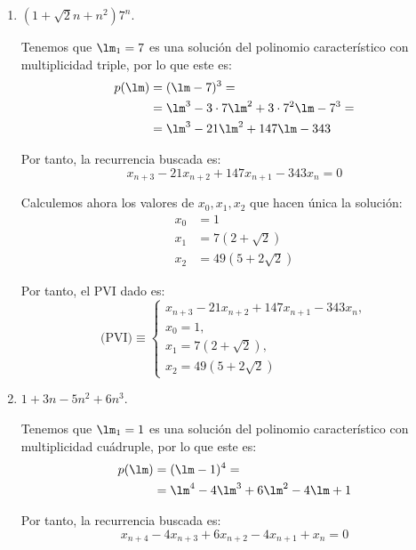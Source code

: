 \begin{ejercicio}
\begin{enumerate}
        \item $(1+\sqrt{2}n+n^2)7^n$.

        Tenemos que $\lm_1=7$ es una solución del polinomio característico con multiplicidad triple, por lo que este es:
        \begin{align*}
            p(\lm) &= (\lm-7)^3 =\\
            &= \lm^3 -3\cdot 7\lm^2 + 3\cdot 7^2\lm -7^3=\\
            &= \lm^3 -21\lm^2 + 147 \lm -343
        \end{align*}

        Por tanto, la recurrencia buscada es:
        \begin{equation*}
            x_{n+3} -21x_{n+2}+147x_{n+1} -343x_n=0
        \end{equation*}
        
        Calculemos ahora los valores de $x_0,x_1,x_2$ que hacen única la solución:
        \begin{align*}
            x_0 &= 1 \\
            x_1 &= 7(2+\sqrt{2})\\
            x_2 &= 49(5+2\sqrt{2})
        \end{align*}

        Por tanto, el PVI dado es:
        \begin{equation*}
            \text{(PVI)}\equiv \left\{ \begin{array}{l}
                x_{n+3} -21x_{n+2}+147x_{n+1} -343x_n,\\
                x_0=1,\\
                x_1=7(2+\sqrt{2}),\\
                x_2=49(5+2\sqrt{2})
            \end{array}\right.
        \end{equation*}
        
        \item $1+3n-5n^2+6n^3$.

        Tenemos que $\lm_1=1$ es una solución del polinomio característico con multiplicidad cuádruple, por lo que este es:
        \begin{align*}
            p(\lm) &= (\lm-1)^4 =\\
            &= \lm^4-4\lm^3 +6\lm^2-4\lm +1
        \end{align*}

        Por tanto, la recurrencia buscada es:
        \begin{equation*}
            x_{n+4} -4x_{n+3} +6x_{n+2}-4x_{n+1} +x_n=0
        \end{equation*}
        

\end{enumerate}
\end{ejercicio}
